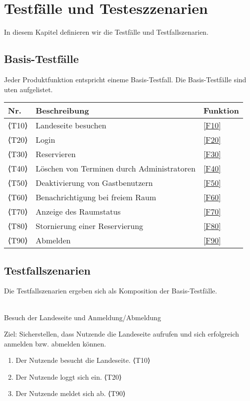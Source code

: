 \chapter{Testfälle und Testeszzenarien}
\label{chap:test}
In diesem Kapitel definieren wir die Testfälle und Testfallszenarien.

\section{Basis-Testfälle}

Jeder Produktfunktion entspricht eineme Basis-Testfall. Die Basis-Testfälle sind uten aufgelistet.


\begin{table}[htbp]


  \centering
  \begin{tabularx}{\textwidth}{ l|X|l }
      \textbf{Nr.} & \textbf{Beschreibung} & \textbf{Funktion} \\ \hline\hline
      ⟨T10⟩ & Landeseite besuchen &\ref{F10}\\
      ⟨T20⟩& Login &\ref{F20} \\
      ⟨T30⟩ & Reservieren &\ref{F30} \\
      ⟨T40⟩& Löschen von Terminen durch Administratoren &\ref{F40} \\
      ⟨T50⟩ & Deaktivierung von Gastbenutzern &\ref{F50} \\
      ⟨T60⟩ & Benachrichtigung bei freiem Raum &\ref{F60} \\
      ⟨T70⟩ & Anzeige des Raumstatus &\ref{F70} \\
      ⟨T80⟩ & Stornierung einer Reservierung &\ref{F80} \\
      ⟨T90⟩ & Abmelden &\ref{F90} \\
  \end{tabularx}
\end{table}

\section{Testfallszenarien}
Die Testfallszenarien ergeben sich als Komposition der Basis-Testfälle.\\ \\
\begin{scenario}{10}{Besuch der Landeseite und Anmeldung/Abmeldung}
  \item[Ziel:] Sicherstellen, dass Nutzende die Landeseite aufrufen und sich erfolgreich anmelden bzw. abmelden können.
  \begin{enumerate}
    \item Der Nutzende besucht die Landeseite. ⟨T10⟩
    \item Der Nutzende loggt sich ein. ⟨T20⟩
    \item Der Nutzende meldet sich ab. ⟨T90⟩
  \end{enumerate}
\end{scenario}

